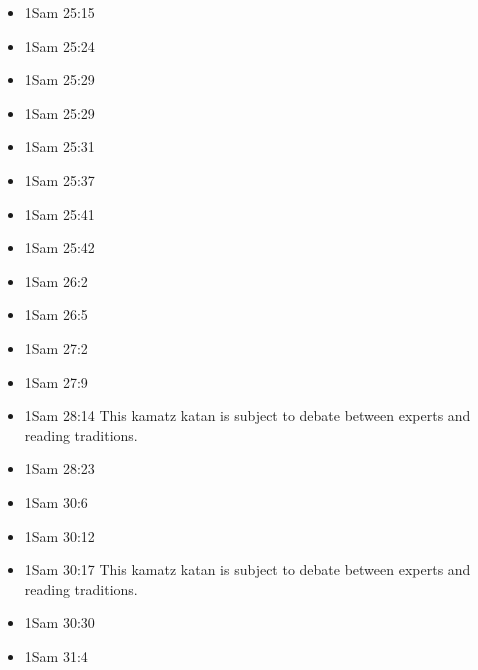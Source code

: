 \documentclass[14pt]{book}
\begin{document}
\begin{multicols}{2}
\begin{itemize}
							\item 1Sam 25:15
							
							\item 1Sam 25:24
							
							\item 1Sam 25:29
							
							\item 1Sam 25:29
							
							\item 1Sam 25:31
							
							\item 1Sam 25:37
							
							\item 1Sam 25:41
							
							\item 1Sam 25:42
							
							\item 1Sam 26:2
							
							\item 1Sam 26:5
							
							\item 1Sam 27:2
							
							\item 1Sam 27:9
							
							\item 1Sam 28:14 This kamatz katan is subject to debate between experts and reading traditions.
							
							\item 1Sam 28:23
							
							\item 1Sam 30:6
							
							\item 1Sam 30:12
							
							\item 1Sam 30:17 This kamatz katan is subject to debate between experts and reading traditions.
							
							\item 1Sam 30:30
							
							\item 1Sam 31:4
							

\end{itemize}
\end{multicols}
\end{document}
